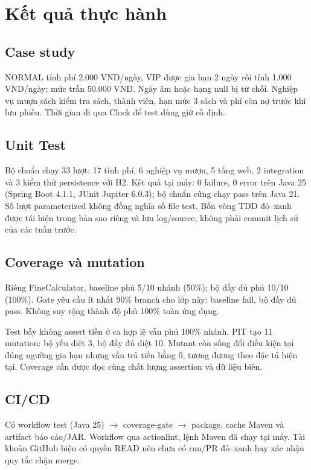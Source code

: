 \documentclass[12pt,a4paper]{article}
\begin{document}
\section{Kết quả thực hành}
\subsection{Case study}
NORMAL tính phí 2.000 VND/ngày, VIP được gia hạn 2 ngày rồi tính 1.000 VND/ngày; mức trần 50.000 VND. Ngày âm hoặc hạng null bị từ chối. Nghiệp vụ mượn sách kiểm tra sách, thành viên, hạn mức 3 sách và phí còn nợ trước khi lưu phiếu. Thời gian đi qua Clock để test dùng giờ cố định.

\subsection{Unit Test}
Bộ chuẩn chạy 33 lượt: 17 tính phí, 6 nghiệp vụ mượn, 5 tầng web, 2 integration và 3 kiểm thử persistence với H2. Kết quả tại máy: 0 failure, 0 error trên Java 25 (Spring Boot 4.1.1, JUnit Jupiter 6.0.3); bộ chuẩn cũng chạy pass trên Java 21. Số lượt parameterized không đồng nghĩa số file test. Bốn vòng TDD đỏ--xanh được tái hiện trong bản sao riêng và lưu log/source, không phải commit lịch sử của các tuần trước.

\subsection{Coverage và mutation}
Riêng FineCalculator, baseline phủ 5/10 nhánh (50\%); bộ đầy đủ phủ 10/10 (100\%). Gate yêu cầu ít nhất 90\% branch cho lớp này: baseline fail, bộ đầy đủ pass. Không suy rộng thành độ phủ 100\% toàn ứng dụng.

Test bẫy không assert tiền ở ca hợp lệ vẫn phủ 100\% nhánh. PIT tạo 11 mutation: bộ yếu diệt 3, bộ đầy đủ diệt 10. Mutant còn sống đổi điều kiện tại đúng ngưỡng gia hạn nhưng vẫn trả tiền bằng 0, tương đương theo đặc tả hiện tại. Coverage cần được đọc cùng chất lượng assertion và dữ liệu biên.

\subsection{CI/CD}
Có workflow test (Java 25) $\rightarrow$ coverage-gate $\rightarrow$ package, cache Maven và artifact báo cáo/JAR. Workflow qua actionlint, lệnh Maven đã chạy tại máy. Tài khoản GitHub hiện có quyền READ nên chưa có run/PR đỏ--xanh hay xác nhận quy tắc chặn merge.
\end{document}
